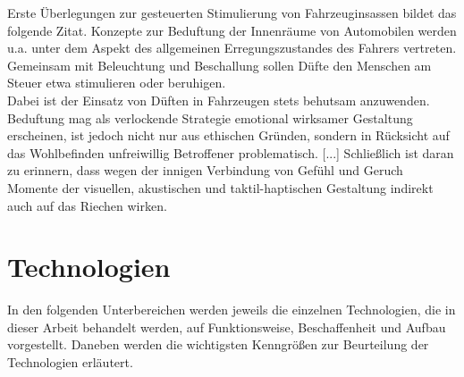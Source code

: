 Erste Überlegungen zur gesteuerten Stimulierung von Fahrzeuginsassen bildet das folgende Zitat.
\glqq Konzepte zur Beduftung der Innenräume von Automobilen werden u.a. unter dem Aspekt des allgemeinen Erregungszustandes des Fahrers vertreten. Gemeinsam mit Beleuchtung und Beschallung sollen Düfte den Menschen am Steuer etwa stimulieren oder beruhigen.\grqq{} \cite[Seite 122 f.]{Schonhammer.2013} \\
Dabei ist der Einsatz von Düften in Fahrzeugen stets behutsam anzuwenden. \\
\glqq Beduftung mag als verlockende Strategie emotional wirksamer Gestaltung erscheinen, ist jedoch nicht nur aus ethischen Gründen, sondern in Rücksicht auf das Wohlbefinden unfreiwillig Betroffener problematisch. [...] Schließlich ist daran zu erinnern, dass wegen der innigen Verbindung von Gefühl und Geruch Momente der visuellen, akustischen und taktil-haptischen Gestaltung indirekt auch auf das Riechen wirken. \grqq{} \cite[Seite 123]{Schonhammer.2013}
\section{Technologien}
In den folgenden Unterbereichen werden jeweils die einzelnen Technologien, die in dieser Arbeit behandelt werden, auf Funktionsweise, Beschaffenheit und Aufbau vorgestellt. Daneben werden die wichtigsten Kenngrößen zur Beurteilung der Technologien erläutert.
